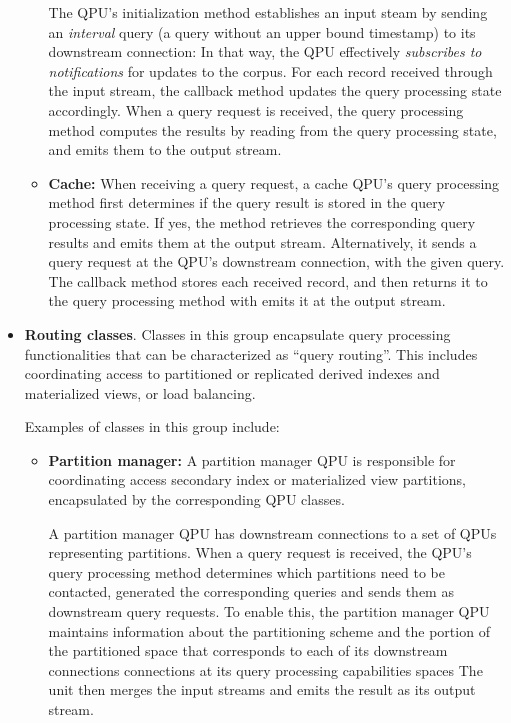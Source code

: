 \begin{itemize}
\begin{itemize}
    The QPU's initialization method establishes an input steam by sending an \textit{interval} query
    (a query without an upper bound timestamp) to its downstream connection:
    In that way, the QPU effectively \textit{subscribes to notifications} for updates to the corpus.
    For each record received through the input stream, the callback method updates the query processing state accordingly.
    When a query request is received,
    the query processing method computes the results by reading from the query processing state,
    and emits them to the output stream.

    \item \textbf{Cache:}
    When receiving a query request, a cache QPU's query processing method first determines if the query result is stored
    in the query processing state.
    If yes, the method retrieves the corresponding query results and emits them at the output stream.
    Alternatively, it sends a query request at the QPU's downstream connection,
    with the given query.
    The callback method stores each received record, and then returns it to the query processing method with emits it
    at the output stream.
    \end{itemize}

  \item \textbf{Routing classes}.
  Classes in this group encapsulate query processing functionalities that can be characterized as ``query routing''.
  This includes coordinating access to partitioned or replicated derived indexes and materialized views,
  or load balancing.

  Examples of classes in this group include:
  \begin{itemize}
    \item \textbf{Partition manager:}
    A partition manager QPU is responsible for coordinating access secondary index or materialized view partitions,
    encapsulated by the corresponding QPU classes.

    A partition manager QPU has downstream connections to a set of QPUs representing partitions.
    When a query request is received, the QPU's query processing method determines which partitions need to be contacted,
    generated the corresponding queries and sends them as downstream query requests.
    To enable this, the partition manager QPU maintains information about the partitioning scheme and the portion of
    the partitioned space that corresponds to each of its downstream connections connections at its query processing
    capabilities spaces
    The unit then merges the input streams and emits the result as its output stream.


\end{itemize}
\end{itemize}
